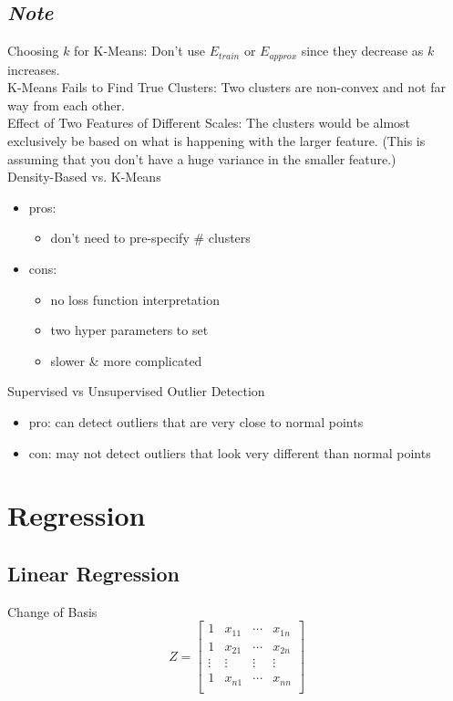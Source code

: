 \documentclass[10pt,landscape,a4paper]{article}
\begin{document}
\begin{multicols*}{5}
\subsection{\emph{Note}}
Choosing \(k\) for K-Means: Don't use \(E_{train}\) or \(E_{approx}\) since they decrease as \(k\) increases. \\
K-Means Fails to Find True Clusters: Two clusters are non-convex and not far way from each other. \\
Effect of Two Features of Different Scales: The clusters would be almost exclusively be based on what is happening with the larger feature. (This is assuming that you don't have a huge variance in the smaller feature.) \\
Density-Based vs. K-Means
\begin{itemize}
    \item pros:
    \begin{itemize}
        \item don't need to pre-specify \# clusters
    \end{itemize}
    \item cons:
    \begin{itemize}
        \item no loss function interpretation
        \item two hyper parameters to set
        \item slower \& more complicated
    \end{itemize}
\end{itemize}
Supervised vs Unsupervised Outlier Detection
\begin{itemize}
    \item pro: can detect outliers that are very close to normal points
    \item con: may not detect outliers that look very different than normal points
\end{itemize}

\section{Regression}

\subsection{Linear Regression}
Change of Basis
\begin{dmath*}
    Z =
    \begin{bmatrix}
        1 & x_{11} & \cdots & x_{1n} \\
        1 & x_{21} & \cdots & x_{2n} \\
        \vdots & \vdots & \vdots & \vdots \\
        1 & x_{n1} & \cdots & x_{nn} \\
    \end{bmatrix}
\end{dmath*}


\end{multicols*}
\end{document}

